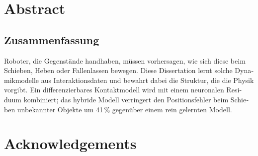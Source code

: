 \documentclass[11pt,oneside,a4paper]{report}
\begin{document}


\chapter*{Abstract}

\clearpage
\begin{otherlanguage}{ngerman}
\chapter*{Zusammenfassung}
Roboter, die Gegenstände handhaben, müssen vorhersagen, wie sich diese beim Schieben, Heben
oder Fallenlassen bewegen. Diese Dissertation lernt solche Dynamikmodelle aus
Interaktionsdaten und bewahrt dabei die Struktur, die die Physik vorgibt. Ein
differenzierbares Kontaktmodell wird mit einem neuronalen Residuum kombiniert; das hybride
Modell verringert den Positionsfehler beim Schieben unbekannter Objekte um 41\,\% gegenüber
einem rein gelernten Modell.
\end{otherlanguage}
\clearpage
\chapter*{Acknowledgements}

\clearpage
\tableofcontents
\listoffigures
\listoftables
\clearpage
{}






\appendix




\end{document}
